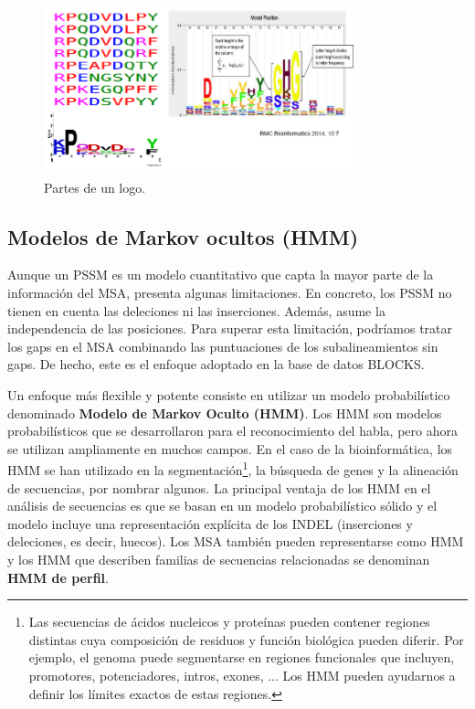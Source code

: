 \begin{figure}[htbp]
\centering
\includegraphics[width = 0.8\textwidth]{figs/logo-parts.png}
\caption{Partes de un logo.}
\end{figure}

\subsection{Modelos de Markov ocultos (HMM)}
Aunque un PSSM es un modelo cuantitativo que capta la mayor parte de la información del MSA, presenta algunas limitaciones. En concreto, los PSSM no tienen en cuenta las deleciones ni las inserciones. Además, asume la independencia de las posiciones. Para superar esta limitación, podríamos tratar los gaps en el MSA combinando las puntuaciones de los subalineamientos sin gaps. De hecho, este es el enfoque adoptado en la base de datos BLOCKS.

Un enfoque más flexible y potente consiste en utilizar un modelo probabilístico denominado \textbf{Modelo de Markov Oculto (HMM)}. Los HMM son modelos probabilísticos que se desarrollaron para el reconocimiento del habla, pero ahora se utilizan ampliamente en muchos campos. En el caso de la bioinformática, los HMM se han utilizado en la segmentación\footnote{Las secuencias de ácidos nucleicos y proteínas pueden contener regiones distintas cuya composición de residuos y función biológica pueden diferir. Por ejemplo, el genoma puede segmentarse en regiones funcionales que incluyen, promotores, potenciadores, intros, exones, ... Los HMM pueden ayudarnos a definir los límites exactos de estas regiones.}, la búsqueda de genes y la alineación de secuencias, por nombrar algunos. La principal ventaja de los HMM en el análisis de secuencias es que se basan en un modelo probabilístico sólido y el modelo incluye una representación explícita de los INDEL (inserciones y deleciones, es decir, huecos). Los MSA también pueden representarse como HMM y los HMM que describen familias de secuencias relacionadas se denominan \textbf{HMM de perfil}.

